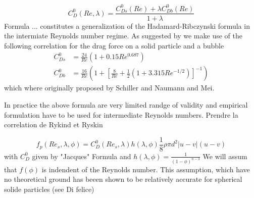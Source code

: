 \begin{equation}
C_D^0(Re,\lambda) = \frac{C_{Ds}^0(Re)+\lambda C_{Db}^0(Re)}{1+\lambda}
\end{equation}
Formula ... constitutes a generalization of the Hadamard-Ribczynski formula in the intermiate Reynolds number regime. As suggested by \citet{magnaudet1997} we make use of the following correlation for the drag force on a solid particle and a bubble
\begin{align}
C_{Ds} ^0 &= \frac{24}{Re}(1+0.15Re^{0.687}) \\
C_{Db} ^0 &= \frac{16}{Re}\left(1+\left[\frac{8}{Re}+\frac{1}{2}\left(1+3.315Re^{-1/2}\right)\right]^{-1}\right)
\end{align}
which where originally proposed by Schiller and Naumann and Mei. %






In practice the above formula are very limited randge of validity and empirical formulation have to be used for intermediate Reynolds numbers. Prendre la correlation de Rykind et Ryskin



\begin{equation}
f_p (Re_s,\lambda,\phi) = C_D^0(Re_s,\lambda)h(\lambda,\phi)\frac{1}{8}\rho \pi d^2 |u-v|(u-v)
\end{equation}
with $C_D^0$ given by "Jacques" Formula and  $h(\lambda,\phi)=\frac{1}{(1-\phi)^{n-3}}$
We will assum that $f(\phi)$ is indendent of the Reynolds number. This assumption, which have no theoretical ground has beeen shown to be relatively accurate for spherical solide particles (see Di felice)



